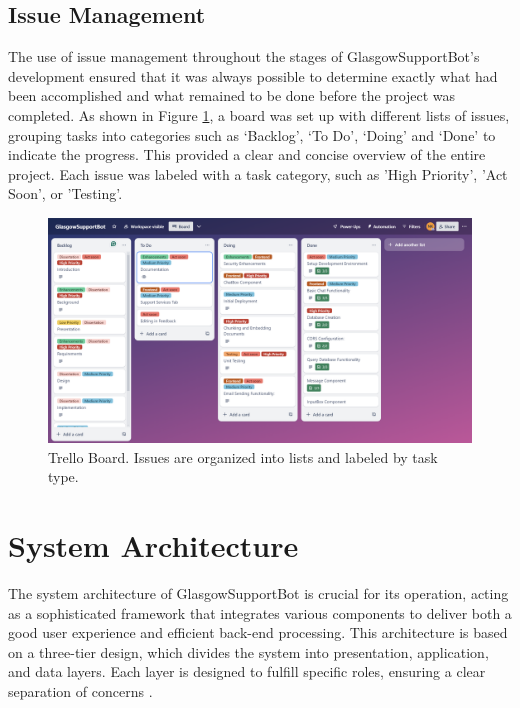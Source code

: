 \documentclass{l4proj}
\begin{document}
\subsection{Issue Management}

The use of issue management throughout the stages of GlasgowSupportBot’s development ensured that it was always possible to determine exactly what had been accomplished and what remained to be done before the project was completed. As shown in Figure \ref{Issue Tracker}, a \cite{trello} board was set up with different lists of issues, grouping tasks into categories such as ‘Backlog’, ‘To Do’, ‘Doing’ and
‘Done’ to indicate the progress. This provided a clear and concise overview of the entire project. Each issue was labeled with a task category, such as 'High Priority', 'Act Soon', or 'Testing'. 

\begin{figure}[!htb]
  \centering
  \begin{adjustbox}{center,max height=0.30\textheight, max width=\linewidth}
    \includegraphics{images/issuetracker.png}
  \end{adjustbox}
  \caption{Trello Board. Issues are organized into lists and labeled by task type.}
  \label{Issue Tracker}
\end{figure}

\section{System Architecture}
The system architecture of GlasgowSupportBot is crucial for its operation, acting as a sophisticated framework that integrates various components to deliver both a good user experience and efficient back-end processing. This architecture is based on a three-tier design, which divides the system into presentation, application, and data layers. Each layer is designed to fulfill specific roles, ensuring a clear separation of concerns \citep{DesignStrategy}.
\end{document}
